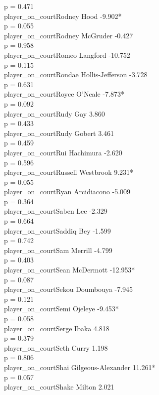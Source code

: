 \documentclass[
  landscape]{article}
\begin{document}
p = 0.471\\
player\_on\_courtRodney Hood -9.902*\\
p = 0.055\\
player\_on\_courtRodney McGruder -0.427\\
p = 0.958\\
player\_on\_courtRomeo Langford -10.752\\
p = 0.115\\
player\_on\_courtRondae Hollis-Jefferson -3.728\\
p = 0.631\\
player\_on\_courtRoyce O'Neale -7.873*\\
p = 0.092\\
player\_on\_courtRudy Gay 3.860\\
p = 0.433\\
player\_on\_courtRudy Gobert 3.461\\
p = 0.459\\
player\_on\_courtRui Hachimura -2.620\\
p = 0.596\\
player\_on\_courtRussell Westbrook 9.231*\\
p = 0.055\\
player\_on\_courtRyan Arcidiacono -5.009\\
p = 0.364\\
player\_on\_courtSaben Lee -2.329\\
p = 0.664\\
player\_on\_courtSaddiq Bey -1.599\\
p = 0.742\\
player\_on\_courtSam Merrill -4.799\\
p = 0.403\\
player\_on\_courtSean McDermott -12.953*\\
p = 0.087\\
player\_on\_courtSekou Doumbouya -7.945\\
p = 0.121\\
player\_on\_courtSemi Ojeleye -9.453*\\
p = 0.058\\
player\_on\_courtSerge Ibaka 4.818\\
p = 0.379\\
player\_on\_courtSeth Curry 1.198\\
p = 0.806\\
player\_on\_courtShai Gilgeous-Alexander 11.261*\\
p = 0.057\\
player\_on\_courtShake Milton 2.021\\
\end{document}
